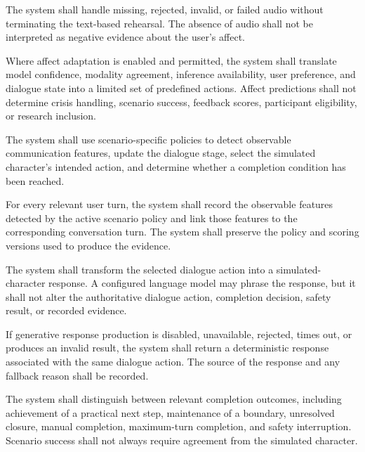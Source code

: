 \begin{description}[leftmargin=!,labelwidth=3.7cm,style=nextline]
    \item[\textbf{FR13. Missing-modality handling}]
    The system shall handle missing, rejected, invalid, or failed audio without terminating the text-based rehearsal. The absence of audio shall not be interpreted as negative evidence about the user's affect.

    \item[\textbf{FR14. Bounded affect adaptation}]
    Where affect adaptation is enabled and permitted, the system shall translate model confidence, modality agreement, inference availability, user preference, and dialogue state into a limited set of predefined actions. Affect predictions shall not determine crisis handling, scenario success, feedback scores, participant eligibility, or research inclusion.

    \item[\textbf{FR15. Deterministic dialogue progression}]
    The system shall use scenario-specific policies to detect observable communication features, update the dialogue stage, select the simulated character's intended action, and determine whether a completion condition has been reached.

    \item[\textbf{FR16. Evidence recording}]
    For every relevant user turn, the system shall record the observable features detected by the active scenario policy and link those features to the corresponding conversation turn. The system shall preserve the policy and scoring versions used to produce the evidence.

    \item[\textbf{FR17. Constrained response realisation}]
    The system shall transform the selected dialogue action into a simulated-character response. A configured language model may phrase the response, but it shall not alter the authoritative dialogue action, completion decision, safety result, or recorded evidence.

    \item[\textbf{FR18. Deterministic fallback}]
    If generative response production is disabled, unavailable, rejected, times out, or produces an invalid result, the system shall return a deterministic response associated with the same dialogue action. The source of the response and any fallback reason shall be recorded.

    \item[\textbf{FR19. Explicit rehearsal outcomes}]
    The system shall distinguish between relevant completion outcomes, including achievement of a practical next step, maintenance of a boundary, unresolved closure, manual completion, maximum-turn completion, and safety interruption. Scenario success shall not always require agreement from the simulated character.


\end{description}
